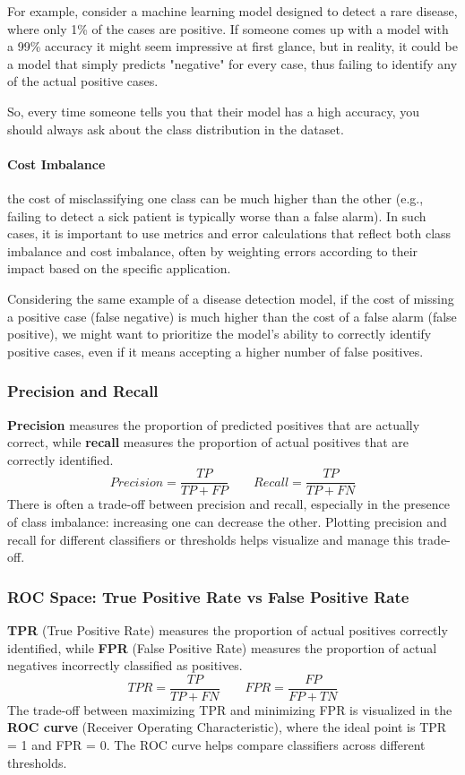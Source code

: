 For example, consider a machine learning model designed to detect a rare disease, where only 1\% of the cases are positive.
If someone comes up with a model with a 99\% accuracy it might seem impressive at first glance, but in reality, it could be 
a model that simply predicts "negative" for every case, thus failing to identify any of the actual positive cases.

So, every time someone tells you that their model has a high accuracy, you should always ask about the class distribution in the dataset.

\paragraph{Cost Imbalance} the cost of misclassifying one class can be much higher than the other 
(e.g., failing to detect a sick patient is typically worse than a false alarm).
In such cases, it is important to use metrics and error calculations that reflect both class imbalance and cost imbalance, 
often by weighting errors according to their impact based on the specific application.

Considering the same example of a disease detection model, if the cost of missing a positive case (false negative) is much higher than the cost of a false alarm (false positive), 
we might want to prioritize the model's ability to correctly identify positive cases, even if it means accepting a higher number of false positives.

\subsubsection*{Precision and Recall}
\textbf{Precision} measures the proportion of predicted positives that are actually correct, while \textbf{recall} measures the proportion of actual positives that are correctly identified.
\[
    Precision = \frac{TP}{TP + FP} \quad\quad Recall = \frac{TP}{TP + FN}
\]
There is often a trade-off between precision and recall, especially in the presence of class imbalance: increasing one can decrease the other. 
Plotting precision and recall for different classifiers or thresholds helps visualize and manage this trade-off.

\subsubsection*{ROC Space: True Positive Rate vs False Positive Rate}
\textbf{TPR} (True Positive Rate) measures the proportion of actual positives correctly identified, while \textbf{FPR} (False Positive Rate) measures the proportion of actual negatives incorrectly classified as positives.
\[
    TPR = \frac{TP}{TP + FN} \quad\quad FPR = \frac{FP}{FP + TN}
\]
The trade-off between maximizing TPR and minimizing FPR is visualized in the \textbf{ROC curve} (Receiver Operating Characteristic), where the ideal point is TPR = 1 and FPR = 0.
The ROC curve helps compare classifiers across different thresholds.

